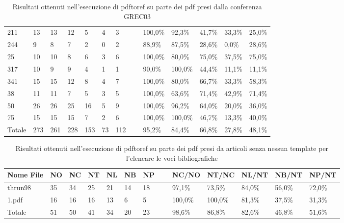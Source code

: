 \begin{table}
\begin{center}
\begin{tabular}{|l|l|l|l|l|l|l|l|l|l|l|l|l|}
211 & 13 & 13 & 12 & 5 & 4 & 3 & ~ & 100,0\% & 92,3\% & 41,7\% & 33,3\% & 25,0\%\\
244 & 9 & 8 & 7 & 2 & 0 & 2 & ~ & 88,9\% & 87,5\% & 28,6\% & 0,0\% & 28,6\%\\
25 & 10 & 10 & 8 & 6 & 3 & 6 & ~ & 100,0\% & 80,0\% & 75,0\% & 37,5\% & 75,0\%\\
317 & 10 & 9 & 9 & 4 & 1 & 1 & ~ & 90,0\% & 100,0\% & 44,4\% & 11,1\% & 11,1\%\\
341 & 15 & 15 & 12 & 8 & 4 & 7 & ~ & 100,0\% & 80,0\% & 66,7\% & 33,3\% & 58,3\%\\
38 & 11 & 11 & 7 & 5 & 3 & 5 & ~ & 100,0\% & 63,6\% & 71,4\% & 42,9\% & 71,4\%\\
50 & 26 & 26 & 25 & 16 & 5 & 9 & ~ & 100,0\% & 96,2\% & 64,0\% & 20,0\% & 36,0\%\\
75 & 15 & 15 & 15 & 7 & 2 & 6 & ~ & 100,0\% & 100,0\% & 46,7\% & 13,3\% & 40,0\%\\ \hline
Totale & 273 & 261 & 228 & 153 & 73 & 112 & ~ & 95,2\% & 84,4\% & 66,8\% & 27,8\% & 48,1\%\\ \hline
	\end{tabular}
	\tiny{\caption{Risultati ottenuti nell'esecuzione di pdftoref su parte dei pdf presi dalla conferenza GREC03 }}
	\end{center}
	\end{table}
	

	\begin{table}\label{tab:icdar}
	\begin{center}
	\begin{tabular}{|l|l|l|l|l|l|l|l|l|l|l|l|l|} \hline
Nome File & NO & NC & NT & NL & NB & NP & ~ & NC/NO & NT/NC & NL/NT & NB/NT & NP/NT \\ \hline
thrun98 & 35 & 34 & 25 & 21 & 14 & 18 & ~ & 97,1\% & 73,5\% & 84,0\% & 56,0\% & 72,0\%\\
1.pdf & 16 & 16 & 16 & 13 & 6 & 5 & ~ & 100,0\% & 100,0\% & 81,3\% & 37,5\% & 31,3\%\\ \hline
Totale & 51 & 50 & 41 & 34 & 20 & 23 & ~ & 98,6\% & 86,8\% & 82,6\% & 46,8\% & 51,6\%\\ \hline
	\end{tabular}
	\tiny{\caption{Risultati ottenuti nell'esecuzione di pdftoref su parte dei pdf presi da articoli senza nessun template per l'elencare le voci bibliografiche}}
	\end{center}
	\end{table}
	

